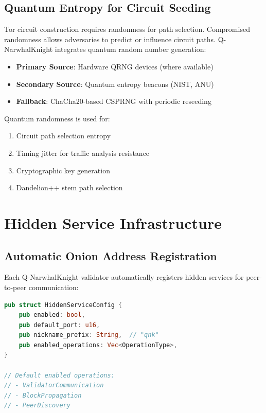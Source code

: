 \documentclass[11pt,a4paper]{article}
\begin{document}
\subsection{Quantum Entropy for Circuit Seeding}

Tor circuit construction requires randomness for path selection. Compromised randomness allows adversaries to predict or influence circuit paths. Q-NarwhalKnight integrates quantum random number generation:

\begin{itemize}[leftmargin=*]
    \item \textbf{Primary Source}: Hardware QRNG devices (where available)
    \item \textbf{Secondary Source}: Quantum entropy beacons (NIST, ANU)
    \item \textbf{Fallback}: ChaCha20-based CSPRNG with periodic reseeding
\end{itemize}

Quantum randomness is used for:
\begin{enumerate}[leftmargin=*]
    \item Circuit path selection entropy
    \item Timing jitter for traffic analysis resistance
    \item Cryptographic key generation
    \item Dandelion++ stem path selection
\end{enumerate}

\section{Hidden Service Infrastructure}

\subsection{Automatic Onion Address Registration}

Each Q-NarwhalKnight validator automatically registers hidden services for peer-to-peer communication:

\begin{lstlisting}[language=Rust, caption=Hidden Service Configuration]
pub struct HiddenServiceConfig {
    pub enabled: bool,
    pub default_port: u16,
    pub nickname_prefix: String,  // "qnk"
    pub enabled_operations: Vec<OperationType>,
}

// Default enabled operations:
// - ValidatorCommunication
// - BlockPropagation
// - PeerDiscovery
\end{lstlisting}
\end{document}

